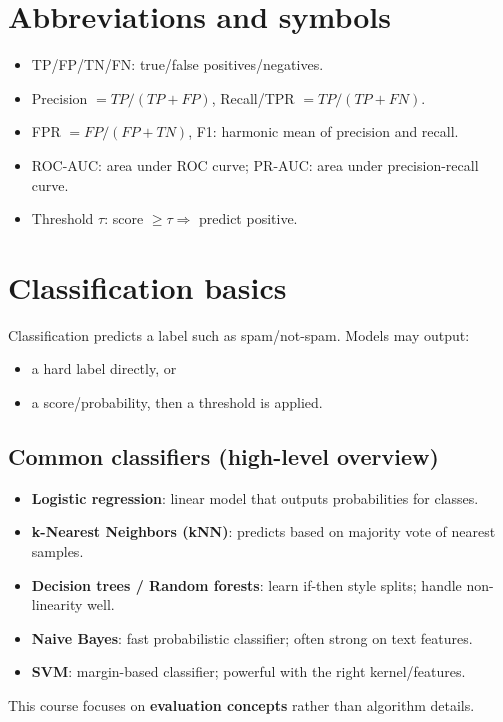 \documentclass[11pt]{article}
\begin{document}
\section{Abbreviations and symbols}
\begin{itemize}[leftmargin=*]
  \item TP/FP/TN/FN: true/false positives/negatives.
  \item Precision $= TP/(TP+FP)$,\; Recall/TPR $= TP/(TP+FN)$.
  \item FPR $= FP/(FP+TN)$,\; F1: harmonic mean of precision and recall.
  \item ROC-AUC: area under ROC curve; PR-AUC: area under precision-recall curve.
  \item Threshold $\tau$: score $\ge \tau \Rightarrow$ predict positive.
\end{itemize}

\section{Classification basics}
Classification predicts a label such as spam/not-spam. Models may output:
\begin{itemize}[leftmargin=*]
  \item a hard label directly, or
  \item a score/probability, then a threshold is applied.
\end{itemize}

\subsection{Common classifiers (high-level overview)}
\begin{itemize}[leftmargin=*]
  \item \textbf{Logistic regression}: linear model that outputs probabilities for classes.
  \item \textbf{k-Nearest Neighbors (kNN)}: predicts based on majority vote of nearest samples.
  \item \textbf{Decision trees / Random forests}: learn if-then style splits; handle non-linearity well.
  \item \textbf{Naive Bayes}: fast probabilistic classifier; often strong on text features.
  \item \textbf{SVM}: margin-based classifier; powerful with the right kernel/features.
\end{itemize}
This course focuses on \textbf{evaluation concepts} rather than algorithm details.
\end{document}
